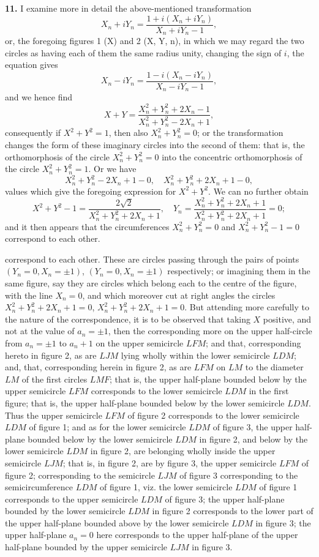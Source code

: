 \documentclass[11pt,a4paper]{article}
\begin{document}
\textbf{11.} I examine more in detail the above-mentioned transformation
\[
X_n + iY_n = \frac{1 + i(X_n + iY_n)}{X_n + iY_n - 1},
\]
or, the foregoing figures 1 (X) and 2 (X, Y, n), in which we may regard the two circles as having each of them the same radius unity, changing the sign of $i$, the equation gives
\[
X_n - iY_n = \frac{1 - i(X_n - iY_n)}{X_n - iY_n - 1},
\]
and we hence find
\[
X + Y = \frac{X_n^2 + Y_n^2 + 2X_n - 1}{X_n^2 + Y_n^2 - 2X_n + 1},
\]
consequently if $X^2 + Y^2 = 1$, then also $X_n^2 + Y_n^2 = 0$; or the transformation changes the form of these imaginary circles into the second of them: that is, the orthomorphosis of the circle $X_n^2 + Y_n^2 = 0$ into the concentric orthomorphosis of the circle $X_n^2 + Y_n^2 = 1$. Or we have
\[
X_n^2 + Y_n^2 - 2X_n + 1 - 0, \quad X_n^2 + Y_n^2 + 2X_n + 1 - 0,
\]
values which give the foregoing expression for $X^2 + Y^2$. We can no further obtain
\[
X^2 + Y^2 - 1 = \frac{2\sqrt{2}}{X_n^2 + Y_n^2 + 2X_n + 1}, \quad Y_n = \frac{X_n^2 + Y_n^2 + 2X_n + 1}{X_n^2 + Y_n^2 + 2X_n + 1} = 0;
\]
and it then appears that the circumferences $X_n^2 + Y_n^2 = 0$ and $X_n^2 + Y_n^2 - 1 = 0$ correspond to each other.

correspond to each other. These are circles passing through the pairs of points $(Y_n = 0, X_n = \pm 1)$, $(Y_n = 0, X_n = \pm 1)$ respectively; or imagining them in the same figure, say they are circles which belong each to the centre of the figure, with the line $X_n = 0$, and which moreover cut at right angles the circles $X_n^2 + Y_n^2 + 2X_n + 1 = 0$, $X_n^2 + Y_n^2 + 2X_n + 1 = 0$. But attending more carefully to the nature of the correspondence, it is to be observed that taking $X$ positive, and not at the value of $a_n = \pm 1$, then the corresponding more on the upper half-circle from $a_n = \pm 1$ to $a_n + 1$ on the upper semicircle $LFM$; and that, corresponding hereto in figure 2, as are $LJM$ lying wholly within the lower semicircle $LDM$; and, that, corresponding herein in figure 2, as are $LFM$ on $LM$ to the diameter $LM$ of the first circles $LMF$; that is, the upper half-plane bounded below by the upper semicircle $LFM$ corresponds to the lower semicircle $LDM$ in the first figure; that is, the upper half-plane bounded below by the lower semicircle $LDM$. Thus the upper semicircle $LFM$ of figure 2 corresponds to the lower semicircle $LDM$ of figure 1; and as for the lower semicircle $LDM$ of figure 3, the upper half-plane bounded below by the lower semicircle $LDM$ in figure 2, and below by the lower semicircle $LDM$ in figure 2, are belonging wholly inside the upper semicircle $LJM$; that is, in figure 2, are by figure 3, the upper semicircle $LFM$ of figure 2; corresponding to the semicircle $LJM$ of figure 3 corresponding to the semicircumference $LDM$ of figure 1, viz. the lower semicircle $LDM$ of figure 1 corresponds to the upper semicircle $LDM$ of figure 3; the upper half-plane bounded by the lower semicircle $LDM$ in figure 2 corresponds to the lower part of the upper half-plane bounded above by the lower semicircle $LDM$ in figure 3; the upper half-plane $a_n = 0$ here corresponds to the upper half-plane of the upper half-plane bounded by the upper semicircle $LJM$ in figure 3.
\end{document}
